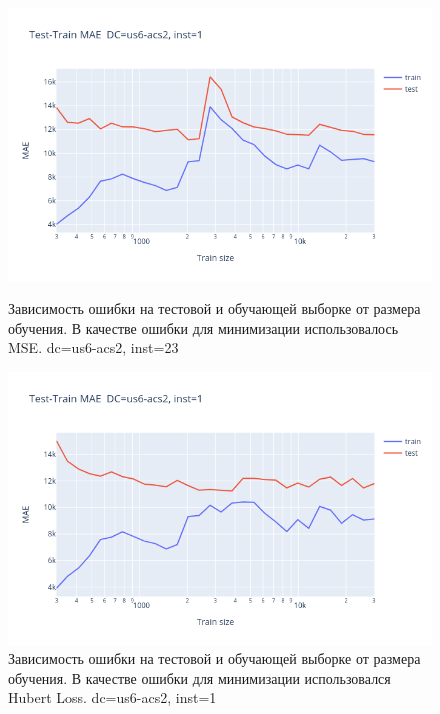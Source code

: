 \documentclass[14pt, a4paper]{extarticle}
\begin{document}
	
	\begin{figure}[!htb]
		\includegraphics[width=\linewidth]{Figures/Test-Train_MSE.png}
		\caption{Зависимость ошибки на тестовой и обучающей выборке от размера обучения. В качестве ошибки для минимизации использовалось MSE. dc=us6-acs2, inst=23}\label{fig:test-train_mse}
		\endminipage\hfill
		\includegraphics[width=\linewidth]{Figures/Test-Train_Hubert.png}
		\caption{Зависимость ошибки на тестовой и обучающей выборке от размера обучения. В качестве ошибки для минимизации использовался Hubert Loss. dc=us6-acs2, inst=1}\label{fig:test-train_hubert}
		\endminipage
	\end{figure}
	
\end{document}
